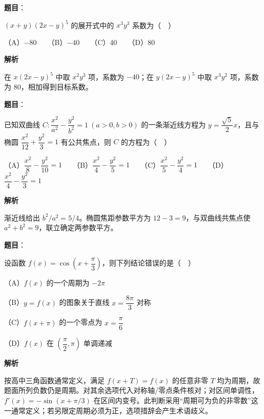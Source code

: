 \begin{answer}

\textbf{题目}：

\((x+y)(2x-y)^5\) 的展开式中的 \(x^3y^3\) 系数为（　）

   （A）\(-80\)　　（B）\(-40\)　　（C）40　　（D）80

\textbf{解析}

在 \(x(2x-y)^5\) 中取 \(x^2y^3\) 项，系数为 \(-40\)；在 \(y(2x-y)^5\) 中取 \(x^3y^2\) 项，系数为 \(80\)，相加得到目标系数。


\end{answer}
\begin{answer}

\textbf{题目}：

已知双曲线 \(C:\dfrac{x^2}{a^2}-\dfrac{y^2}{b^2}=1\ (a>0,b>0)\) 的一条渐近线方程为 \(y=\dfrac{\sqrt5}{2}x\)，且与椭圆 \(\dfrac{x^2}{12}+\dfrac{y^2}{3}=1\) 有公共焦点，则 \(C\) 的方程为（　）

   （A）\(\dfrac{x^2}{8}-\dfrac{y^2}{10}=1\)　　（B）\(\dfrac{x^2}{4}-\dfrac{y^2}{5}=1\)　　（C）\(\dfrac{x^2}{5}-\dfrac{y^2}{4}=1\)　　（D）\(\dfrac{x^2}{4}-\dfrac{y^2}{3}=1\)

\textbf{解析}

渐近线给出 \(b^2/a^2=5/4\)。椭圆焦距参数平方为 \(12-3=9\)，与双曲线共焦点使 \(a^2+b^2=9\)，联立确定两参数平方。


\end{answer}
\begin{answer}

\textbf{题目}：

设函数 \(f(x)=\cos\left(x+\dfrac\pi3\right)\)，则下列结论错误的是（　）

   （A）\(f(x)\) 的一个周期为 \(-2\pi\)

   （B）\(y=f(x)\) 的图象关于直线 \(x=\dfrac{8\pi}{3}\) 对称

   （C）\(f(x+\pi)\) 的一个零点为 \(x=\dfrac\pi6\)

   （D）\(f(x)\) 在 \(\left(\dfrac\pi2,\pi\right)\) 单调递减

\textbf{解析}

按高中三角函数通常定义，满足 \(f(x+T)=f(x)\) 的任意非零 \(T\) 均为周期，故题面所列负数仍是周期。对其余选项代入对称轴/零点条件核对；对区间单调性，\(f'(x)=-\sin(x+\pi/3)\) 在区间内变号。此判断采用“周期可为负的非零数”这一通常定义；若另限定周期必须为正，选项措辞会产生术语歧义。


\end{answer}
